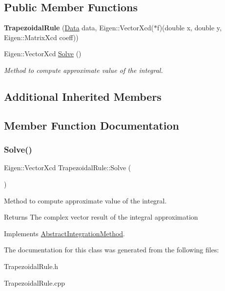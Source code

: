 \subsection*{Public Member Functions}
\begin{DoxyCompactItemize}
\item 
\mbox{\label{class_trapezoidal_rule_ac366b3b5a8758ad00590f029c0b0bdd7}} 
{\bfseries Trapezoidal\+Rule} (\hyperlink{struct_data}{Data} data, Eigen\+::\+Vector\+Xcd($\ast$f)(double x, double y, Eigen\+::\+Matrix\+Xcd coeff))
\item 
Eigen\+::\+Vector\+Xcd \hyperlink{class_trapezoidal_rule_ae822d86948bdc8876bf524cd620e11b8}{Solve} ()
\begin{DoxyCompactList}\small\item\em Method to compute approximate value of the integral. \end{DoxyCompactList}\end{DoxyCompactItemize}
\subsection*{Additional Inherited Members}


\subsection{Member Function Documentation}
\mbox{\label{class_trapezoidal_rule_ae822d86948bdc8876bf524cd620e11b8}} 
\subsubsection{\texorpdfstring{Solve()}{Solve()}}
{\footnotesize\ttfamily Eigen\+::\+Vector\+Xcd Trapezoidal\+Rule\+::\+Solve (\begin{DoxyParamCaption}{ }\end{DoxyParamCaption})\hspace{0.3cm}{\ttfamily [virtual]}}



Method to compute approximate value of the integral. 

\begin{DoxyReturn}{Returns}
The complex vector result of the integral approximation 
\end{DoxyReturn}


Implements \hyperlink{class_abstract_integration_method_af76e5bdce7d0b139d07e920fa29c1c34}{Abstract\+Integration\+Method}.



The documentation for this class was generated from the following files\+:\begin{DoxyCompactItemize}
\item 
Trapezoidal\+Rule.\+h\item 
Trapezoidal\+Rule.\+cpp\end{DoxyCompactItemize}
